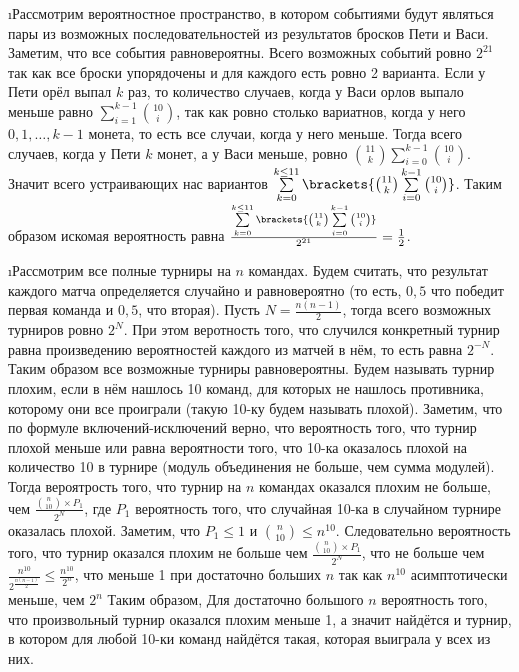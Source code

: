 \i Рассмотрим вероятностное пространство, в котором событиями будут являться пары из возможных последовательностей из результатов бросков Пети и Васи. Заметим, что все события равновероятны. Всего возможных событий ровно $2^{21}$ так как все броски упорядочены и для каждого есть ровно 2 варианта. Если у Пети орёл выпал $k$ раз, то количество случаев, когда у Васи орлов выпало меньше равно $\sum\limits_{i=1}^{k-1} \binom{10}{i}$, так как ровно столько вариатнов, когда у него $0, 1, \ldots, k-1$ монета, то есть все случаи, когда у него меньше. Тогда всего случаев, когда у Пети $k$ монет, а у Васи меньше, ровно $\binom{11}{k}\sum\limits_{i=0}^{k-1}\binom{10}{i}$. Значит всего устраивающих нас вариантов $\sum\limits_{k=0}^{k\leq11}\brackets{\binom{11}{k}\sum\limits_{i=0}^{k-1}\binom{10}{i}}$. Таким образом искомая вероятность равна $\frac{\sum\limits_{k=0}^{k\leq11}\brackets{\binom{11}{k}\sum\limits_{i=0}^{k-1}\binom{10}{i}}}{2^{21}} = \frac{1}{2}$.

\i Рассмотрим все полные турниры на $n$ командах. Будем считать, что результат каждого матча определяется случайно и равновероятно (то есть, $0{,}5$ что победит первая команда и $0{,}5$, что вторая). Пусть $N = \frac{n(n-1)}{2}$, тогда всего возможных турниров ровно $2^N$. При этом веротность того, что случился конкретный турнир равна произведению вероятностей каждого из матчей в нём, то есть равна $2^{-N}$. Таким образом все возможные турниры равновероятны. Будем называть турнир плохим, если в нём нашлось 10 команд, для которых не нашлось противника, которому они все проиграли (такую 10-ку будем называть плохой). Заметим, что по формуле включений-исключений верно, что вероятность того, что турнир плохой меньше или равна вероятности того, что 10-ка оказалось плохой на количество 10 в турнире (модуль объединения не больше, чем сумма модулей). Тогда вероятрость того, что турнир на $n$ командах оказался плохим не больше, чем $\frac{\binom{n}{10}\times P_1}{2^N}$, где $P_1$ вероятность того, что случайная 10-ка в случайном турнире оказалась плохой. Заметим, что $P_1 \leq 1$ и $\binom{n}{10} \leq n^{10}$. Следовательно вероятность того, что турнир оказался плохим не больше чем $\frac{\binom{n}{10}\times P_1}{2^N}$, что не больше чем $\frac{n^{10}}{2^{\frac{n(n-1)}{2}}} \leq \frac{n^{10}}{2^n}$, что меньше 1 при достаточно больших $n$ так как $n^{10}$ асимптотически меньше, чем $2^n$ Таким образом, Для достаточно большого $n$ вероятность того, что произвольный турнир оказался плохим меньше 1, а значит найдётся и турнир, в котором для любой 10-ки команд найдётся такая, которая выиграла у всех из них.
